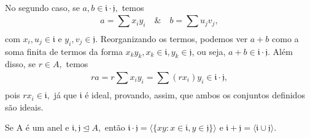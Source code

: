 \documentclass[algebraII_notes.tex]{subfiles}
\begin{document}
No segundo caso, se \(a, b\in \mathfrak{i}\cdot \mathfrak{j},\) temos
\[
	a = \sum\limits_{}^{}x_{i}y_{i}\quad\&\quad b = \sum\limits_{}^{}u_{j}v_{j},
\]
com \(x_{i}, u_{j}\in \mathfrak{i}\) e \(y_{i}, v_{j}\in \mathfrak{j}.\) Reorganizando os termos, podemos ver
\(a+b\) como a soma finita de termos da forma \(x_{k}y_{k}, x_{k}\in \mathfrak{i}, y_{k}\in \mathfrak{j}\), ou seja,
\(a+b\in \mathfrak{i}\cdot \mathfrak{j}\). Além disso, se \(r\in A,\) temos
\[
	ra = r \sum\limits_{}^{}x_{i}y_{i} = \sum\limits_{}^{}(rx_{i})y_{i}\in \mathfrak{i}\cdot \mathfrak{j},
\]
pois \(rx_{i}\in \mathfrak{i},\) já que \(\mathfrak{i}\) é ideal, provando, assim, que ambos os conjuntos definidos são ideais.
\begin{lemma*}
	Se A é um anel e \(\mathfrak{i}, \mathfrak{j}\trianglelefteq{A},\) então \(\mathfrak{i}\cdot \mathfrak{j}=\langle \{xy: x\in \mathfrak{i}, y\in \mathfrak{j}\} \rangle\) e
	\(\mathfrak{i}+\mathfrak{j} = \langle \mathfrak{i}\cup \mathfrak{j} \rangle\).
\end{lemma*}
\end{document}
